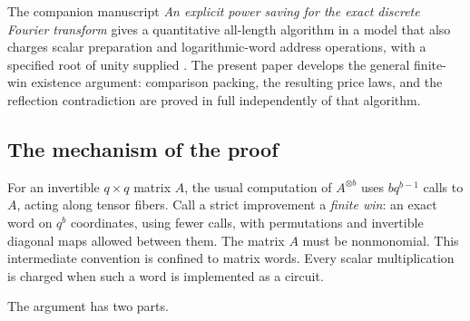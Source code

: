The companion manuscript \emph{An explicit power saving for the exact
discrete Fourier transform} gives a quantitative all-length algorithm
in a model that also charges scalar preparation and logarithmic-word
address operations, with a specified root of unity supplied
\citep[Theorem~1.1]{openaiExplicitFourier2026}.
The present paper develops the general finite-win existence argument:
comparison packing, the resulting price laws, and the reflection
contradiction are proved in full independently of that algorithm.

\subsection{The mechanism of the proof}

For an invertible $q\times q$ matrix $A$, the usual computation of
$A^{\otimes b}$ uses $bq^{b-1}$ calls to $A$, acting along tensor fibers.
Call a strict improvement a \emph{finite win}: an exact word on $q^b$
coordinates, using fewer calls, with permutations and invertible
diagonal maps allowed between them. The matrix $A$ must be nonmonomial.
This intermediate convention is confined to matrix words. Every scalar
multiplication is charged when such a word is implemented as a circuit.

The argument has two parts.

